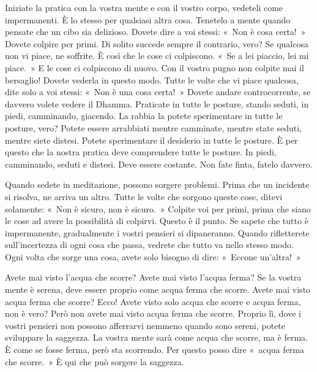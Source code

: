 Iniziate la pratica con la vostra mente e con il vostro corpo, vedeteli
come impermanenti. È lo stesso per qualsiasi altra cosa. Tenetelo a
mente quando pensate che un cibo sia delizioso. Dovete dire a voi
stessi: «~Non è cosa certa!~» Dovete colpire per primi. Di solito
succede sempre il contrario, vero? Se qualcosa non vi piace, ne
soffrite. È così che le cose ci colpiscono. «~Se a lei piaccio, lei mi
piace.~» E le cose ci colpiscono di nuovo. Con il vostro pugno non
colpite mai il bersaglio! Dovete vederla in questo modo. Tutte le volte
che vi piace qualcosa, dite solo a voi stessi: «~Non è una cosa certa!~»
Dovete andare controcorrente, se davvero volete vedere il Dhamma.
Praticate in tutte le posture, stando seduti, in piedi, camminando,
giacendo. La rabbia la potete sperimentare in tutte le posture, vero?
Potete essere arrabbiati mentre camminate, mentre state seduti, mentre
siete distesi. Potete sperimentare il desiderio in tutte le posture. È
per questo che la nostra pratica deve comprendere tutte le posture. In
piedi, camminando, seduti e distesi. Deve essere costante. Non fate
finta, fatelo davvero.

Quando sedete in meditazione, possono sorgere problemi. Prima che un
incidente si risolva, ne arriva un altro. Tutte le volte che sorgono
queste cose, ditevi solamente: «~Non è sicuro, non è sicuro.~» Colpite
voi per primi, prima che siano le cose ad avere la possibilità di
colpirvi. Questo è il punto. Se sapete che tutto è impermanente,
gradualmente i vostri pensieri si dipaneranno. Quando rifletterete
sull'incertezza di ogni cosa che passa, vedrete che tutto va nello
stesso modo. Ogni volta che sorge una cosa, avete solo bisogno di dire:
«~Eccone un'altra!~»

Avete mai visto l'acqua che scorre? Avete mai visto l'acqua ferma? Se la
vostra mente è serena, deve essere proprio come acqua ferma che scorre.
Avete mai visto acqua ferma che scorre? Ecco! Avete visto solo acqua che
scorre e acqua ferma, non è vero? Però non avete mai visto acqua ferma
che scorre. Proprio lì, dove i vostri pensieri non possono afferrarvi
nemmeno quando sono sereni, potete sviluppare la saggezza. La vostra
mente sarà come acqua che scorre, ma è ferma. È come se fosse ferma,
però sta scorrendo. Per questo posso dire «~acqua ferma che scorre.~» È
qui che può sorgere la saggezza.


